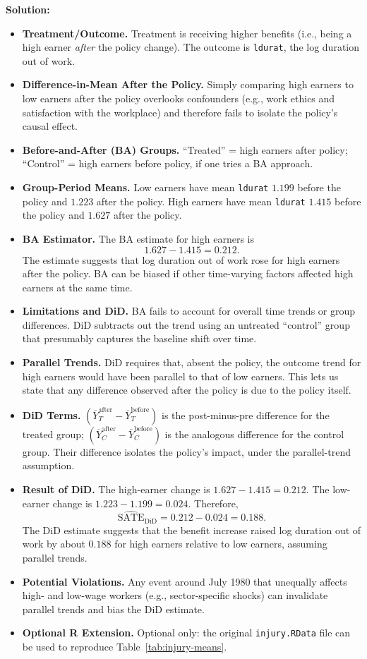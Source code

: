 \documentclass[12pt]{article}
\begin{document}
\noindent \textbf{Solution:}
\begin{itemize}
  \item \textbf{Treatment/Outcome.} Treatment is receiving higher benefits (i.e., being a high earner \emph{after} the policy change). The outcome is \texttt{ldurat}, the log duration out of work.
  \item \textbf{Difference-in-Mean After the Policy.} Simply comparing high earners to low earners after the policy overlooks confounders (e.g., work ethics and satisfaction with the workplace) and therefore fails to isolate the policy's causal effect.
  \item \textbf{Before-and-After (BA) Groups.} “Treated” = high earners after policy; “Control” = high earners before policy, if one tries a BA approach. 
  \item \textbf{Group-Period Means.} Low earners have mean \texttt{ldurat} \(1.199\) before the policy and \(1.223\) after the policy. High earners have mean \texttt{ldurat} \(1.415\) before the policy and \(1.627\) after the policy.
  \item \textbf{BA Estimator.} The BA estimate for high earners is
  \[
    1.627 - 1.415 = 0.212.
  \]
  The estimate suggests that log duration out of work rose for high earners after the policy. BA can be biased if other time-varying factors affected high earners at the same time.
  \item \textbf{Limitations and DiD.} BA fails to account for overall time trends or group differences. DiD subtracts out the trend using an untreated “control” group that presumably captures the baseline shift over time.
  \item \textbf{Parallel Trends.} DiD requires that, absent the policy, the outcome trend for high earners would have been parallel to that of low earners. This lets us state that any difference observed after the policy is due to the policy itself.
  \item \textbf{DiD Terms.} $(\overline{Y}_T^{\mathrm{after}} - \overline{Y}_T^{\mathrm{before}})$ is the post-minus-pre difference for the treated group; $(\overline{Y}_C^{\mathrm{after}} - \overline{Y}_C^{\mathrm{before}})$ is the analogous difference for the control group. Their difference isolates the policy’s impact, under the parallel-trend assumption.
  \item \textbf{Result of DiD.} The high-earner change is \(1.627 - 1.415 = 0.212\). The low-earner change is \(1.223 - 1.199 = 0.024\). Therefore,
  \[
    \widehat{\mathrm{SATE}}_{\mathrm{DiD}} = 0.212 - 0.024 = 0.188.
  \]
  The DiD estimate suggests that the benefit increase raised log duration out of work by about \(0.188\) for high earners relative to low earners, assuming parallel trends.
  \item \textbf{Potential Violations.} Any event around July 1980 that unequally affects high- and low-wage workers (e.g., sector-specific shocks) can invalidate parallel trends and bias the DiD estimate.
  \item \textbf{Optional R Extension.} Optional only: the original \texttt{injury.RData} file can be used to reproduce Table~\ref{tab:injury-means}.
\end{itemize}
\end{document}
